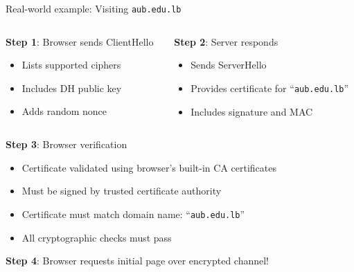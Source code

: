 \documentclass[aspectratio=169, lualatex, handout]{beamer}
\begin{document}
\begin{frame}{Real-world example: Visiting \texttt{aub.edu.lb}}
	\begin{columns}[c]
		\begin{column}{0.5\textwidth}
			\textbf{Step 1}: Browser sends ClientHello
			\begin{itemize}
				\item Lists supported ciphers
				\item Includes DH public key
				\item Adds random nonce
			\end{itemize}
		\end{column}
		\begin{column}{0.5\textwidth}
			\textbf{Step 2}: Server responds
			\begin{itemize}
				\item Sends ServerHello
				\item Provides certificate for ``\texttt{aub.edu.lb}''
				\item Includes signature and MAC
			\end{itemize}
		\end{column}
	\end{columns}
	\pause
	\begin{center}
		\textbf{Step 3}: Browser verification
	\end{center}
	\begin{itemize}
		\item Certificate validated using browser's built-in CA certificates
		\item Must be signed by trusted certificate authority
		\item Certificate must match domain name: ``\texttt{aub.edu.lb}''
		\item All cryptographic checks must pass
	\end{itemize}
	\pause
	\begin{center}
		\textbf{Step 4}: Browser requests initial page over encrypted channel!
	\end{center}
\end{frame}
\end{document}
